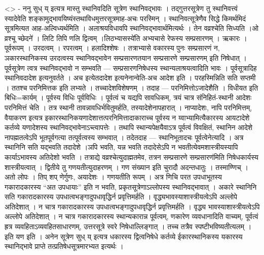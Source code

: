 \textless{}\textgreater{} - ननु सुध् य् इत्यत्र मास्तु स्थानिवदिति
सूत्रेण स्थानिवद्भावः । तद्गुत्तरसूत्रेण तु स्थानिवत्त्वं स्यादेवेति
शङ्कामुद्भावयिष्यंस्तथाविधमुत्तरसूत्रमाह-अचः परस्मिन् ।
स्थानिवत्सूत्रेणैव सिद्धे किमर्थमिदं सूत्रमित्यत आह-अल्विध्यर्थमिति ।
अलाश्रयविधावपि स्थानिवद्भावार्थमित्यर्थः । तेन वव्रश्चेति सिध्यति ।ओ
व्रश्चू च्छेदने॑ । लिटि तिपि णलि द्वित्वम् ।लिठभ्यासस्ये॑ति अभ्यचासे
रेफस्य सम्प्रसारणम् । ऋकारः । पूर्वरूपम् । उरदत्वम् । रपरत्वम् ।
हलादिश्शेषः । तत्राभ्यासे वकारस्य पुनः सम्प्रसारणं न, ञकारस्थानिकस्य
उरदत्वस्य स्थानिवद्भावेन सम्प्रसारणतयान सम्प्रसारणे सम्प्रसारणम् इति
निषेधात् । पूर्वसूत्रेण त्वत्र स्थानिवद्भावो न सम्भवति ---
सम्प्रसारणनिषेधस्य स्थान्यलाश्रयत्वादिति भावः । पूर्वसूत्रादिह
स्थानिवदादेश इत्यनुवर्तते । अच इत्येतदादेश इत्यनेनान्वेति-अच आदेश इति ।
परहस्मिन्निति सति सप्तमी । ततश्च परनिमित्तक इति लभ्यते ।
तच्चादेशविशेषणम् । तदाह --- परनिमित्तोऽजादेशैति । विधीयत इति
बिधिः=कार्यम् । पूर्वस्य विधिः पूर्वविधिः । पूर्वत्वं च यद्यपि सावधिकम्,
त्रयं चात्र संनिहितं-स्थानी आदेशः परनिमित्तं चेति । तत्र स्थानी
तावन्नावधिर्भवितुमर्हति, तस्यादेशेनापहारात् । नाप्यादेशः, नापि
परनिमित्तम्, वैयाकरण इत्यत्र इकारस्थानिकयणादेशात्तत्परनिमित्तादाकाराच्च
पूर्वस्य न य्वाभ्यामित्यैकारस्य आयटादेशे कर्तव्ये यणादेशस्य
स्थानिवद्भावेनाऽच्त्वापत्तेः । तथापि स्थान्यपेक्षयैवाऽत्र पूर्वत्वं
विवक्षितं, स्थानिन आदेशे नापह्मतत्वेऽपि भूतपूर्वगत्या तत्पूर्वत्वस्य
सम्भवात् । तदेतदाह --- स्थानिभूतादचः पूर्वत्वेनेत्यादि । अत्र स्थानिनि
सति यद्भवति तदादेशे ।ञपि भवति, यन्न भवति तदादेसेऽपि न
भवतीत्येवमशास्त्रीयस्यापि कार्याऽभावस्य अतिदेशो भवति । तत्राद्ये
वव्रश्चेत्युदाह्मतमेव, तत्रन सम्प्रसारणे सम्प्रसारण॑मिति निषेधकार्यस्य
शास्त्रीयत्वात् । द्वितीये तु गणयतीत्युदाहरणम् । गण संख्यान इति चुरादौ
अदन्तधातुः । तस्माण्णिच् । अतो लोपः । तिप् शप् णेर्गुणः, अयादेशः ।
गणयतीति रूपम् । अत्र णिचि परत उपधाभूतस्य गकारादकारस्य ``अत उपधायाः'' इति
न भवति, प्रकृतसूत्रेणाऽल्लोपस्य स्थानिवद्भावात् । अकारे स्थानिनि सति
गकारादकारस्य उपधात्वभङ्गादुपधावृद्धिर्न प्रवृत्तिमर्हति ।
वृद्ध्यभावस्याशास्त्रीयत्वेऽपि अल्लोपे अतिदेशात् । न चात्र गकारादकारस्य
उपधात्वभङ्गादुपधावृद्धिर्न प्रवृत्तिमर्हति । वृद्ध्य
भावस्याशास्त्रीयत्वेऽपि अल्लोपे अतिदेशात् । न चात्र गकारादकारस्य
स्थान्यकारान्न पूर्वत्वम्, णकारेण व्यवधानादिति वाच्यम्, पूर्वत्वं ह्रत्र
व्यवहिताऽव्यवहितसाधारणम्, उत्तरसूत्रे स्वरे निषेधाल्लिङ्गात् । तच्च
तत्रैव स्पष्टीभविष्यतीत्यलम् । इति यण इति । अनेन सूत्रेण सुध् य् इत्यत्र
धकारस्य द्वित्वनिषेधे कर्तव्ये ईकारस्थानिकस्य यकारस्य स्थानिद्भावे
प्राप्ते तत्प्रतिषेधसूत्रमारभ्यत इत्यर्थः ।
